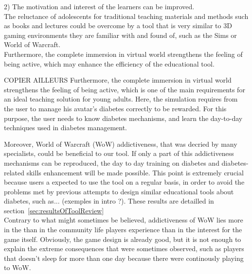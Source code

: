 \documentclass[12pt,MSc]{muthesis}
\begin{document}

2) The motivation and interest of the learners can be improved.\\
The reluctance of adolescents for traditional teaching materials and methods such as books and lectures could be overcome by a tool that is very similar to 3D gaming environments they are familiar with and found of, such as the Sims or World of Warcraft.\\
Furthermore, the complete immersion in virtual world strengthens the feeling of being active, which may enhance the efficiency of the educational tool. 

\iffalse COPIER AILLEURS Furthermore, the complete immersion in virtual world strengthens the feeling of being active, which is one of the main requirements for an ideal teaching solution for young adults. Here, the simulation requires from the user to manage his avatar's diabetes correctly to be rewarded. For this purpose, the user needs to know diabetes mechanisms, and learn the day-to-day techniques used in diabetes management. 

Moreover, World of Warcraft (WoW) addictiveness, that was decried by many specialists, could be beneficial to our tool. If only a part of this addictiveness mechanisms can be reproduced, the day to day training on diabetes and diabetes-related skills enhancement will be made possible. This point is extremely crucial because users a expected to use the tool on a regular basis, in order to avoid the problems met by previous attempts to design similar educational tools about diabetes, such as... (exemples in intro ?). These results are detailled in section~\ref{sec:resultsOfToolReview}\\

Contrary to what might sometimes be believed, addictiveness of WoW lies more in the than in the community life players experience than in the interest for the game itself. Obviously, the game design is already good, but it is not enough to explain the extreme consequences that were sometimes observed, such as players that doesn't sleep for more than one day because there were continously playing to WoW. 
\end{document}
